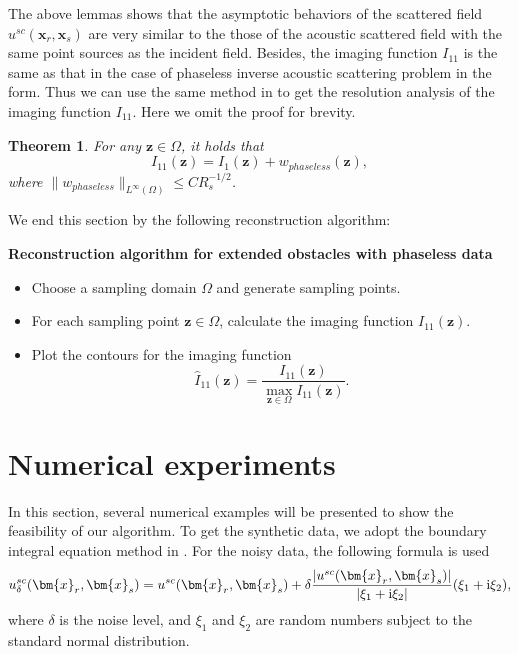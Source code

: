 \documentclass[10pt,a4paper]{article}
\numberwithin{equation}{section}
\newtheorem{theorem}{Theorem}[section]
\begin{document}
The above lemmas shows that the asymptotic behaviors of the scattered field $u^{sc}(\bm{ x }_r,\bm{ x }_s) $ are very similar to the those of the acoustic scattered field with the same point sources as the incident field. Besides, the imaging function $I_{11}$ is the same as that in the case of phaseless inverse acoustic scattering problem in the form. 
Thus we can use the same method in  \cite{chen_phaseless_2017} to get the resolution analysis of the imaging function $I_{11}$. Here we omit the proof for brevity.
\begin{theorem}
  For any $\bm{ z }\in \Omega$, it holds that
  $$I_{11}(\bm{ z }) = I_1(\bm{ z }) + w_{phaseless}(\bm{ z }), $$
  where $\|w_{phaseless}\|_{L^{\infty}(\Omega)}\leq CR_s^{-1/2}$.
\end{theorem}

We end this section by the following reconstruction algorithm:

\vspace{0.5\baselineskip}

\noindent\textbf{Reconstruction algorithm for extended obstacles with phaseless data}
\
\begin{itemize}
    \item  Choose a sampling domain $\Omega$ and generate sampling points.
     \item For each sampling point $\bm{ z }\in \Omega$, calculate the imaging function $I_{11}(\bm{ z })$.
     \item Plot the contours for the imaging function
       $$\hat{I}_{ 11}(\bm{ z })=\dfrac{I_{11}(\bm{ z })}{\max\limits_{\bm{ z }\in \Omega}I_{11}(\bm{ z })}.$$      
\end{itemize}

\section{Numerical experiments}
\label{sec:numerical}
In this section, several numerical examples will be presented to show the feasibility of our algorithm. To get the synthetic data, we adopt the boundary integral equation method in \cite{dong_novel_2024}. For the noisy data, the following formula is used
\begin{equation}
\notag
u^{sc}_{\delta}(\bm{ x }_r, \bm{ x }_s) = u^{sc}(\bm{ x }_r, \bm{ x }_s)
+ \delta \frac{| u^{sc}(\bm{ x }_r, \bm{ x }_s)  | }{|\xi_1+\mathrm{ i } \xi_2|} (\xi_1+\mathrm{ i } \xi_2),
\end{equation}
where $\delta$ is the noise level, and $\xi_1$ and $\xi_2$ are random numbers subject to the standard normal distribution.
\end{document}
